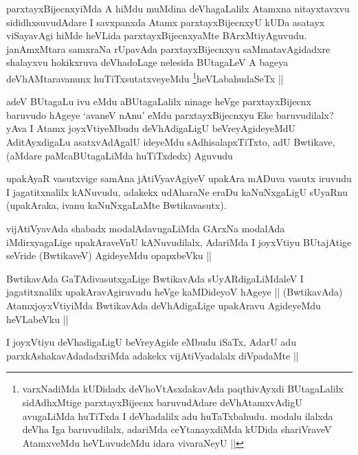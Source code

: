 \begin{artha}
parxtayxBijecnxyiMda A hiMdu muMdina deVhagaLalilx Atamxna nitayxtavxvu sididhxsuvudAdare I savxpanxda Atamx parxtayxBijecnxyU kUDa asatayx viSayavAgi hiMde heVLida parxtayxBijecnxyaMte BArxMtiyAguvudu. janAmxMtara samxraNa rUpavAda parxtayxBijecnxyu saMmatavAgidadxre shalayxvu hokikxruva deVhadoLage nelesida BUtagaLeV A bageya deVhAMtaravanunx huTiTxsutatxveyeMdu \footnote{varxNadiMda kUDidadx deVhoVtAsxdakavAda paqthivAyxdi BUtagaLalilx sidAdhxMtige parxtayxBijecnx baruvudAdare deVhAtamxvAdigU avugaLiMda huTiTxda I deVhadalilx adu huTaTxbahudu. modalu ilalxda deVha Iga baruvudilalx, adariMda ceYtanayxdiMda kUDida shariVraveV AtamxveMdu heVLuvudeMdu idara vivaraNeyU ||}heVLabahudaSeTx ||
\end{artha}

\begin{artha}
adeV BUtagaLu ivu eMdu aBUtagaLalilx ninage heVge parxtayxBijecnx baruvudo hAgeye `avaneV nAnu' eMdu parxtayxBijecnxyu Eke baruvudilalx? yAva I Atamx joyxVtiyeMbudu deVhAdigaLigU beVreyAgideyeMdU AditAyxdigaLu asatxvAdAgalU ideyeMdu sAdhisalapxTiTxto, adU Bwtikave, (aMdare paMcaBUtagaLiMda huTiTxdedx) Aguvudu
\end{artha}

\begin{artha}
upakAyaR vasutxvige samAna jAtiVyavAgiyeV upakAra mADuva vasutx iruvudu I jagatitxnalilx kANuvudu, adakekx udAharaNe eraDu kaNuNxgaLigU sUyaRnu (upakAraka, ivanu kaNuNxgaLaMte Bwtikavasutx).
\end{artha}

\begin{artha}
vijAtiVyavAda shabadx modalAdavugaLiMda GArxNa modalAda iMdirxyagaLige upakAraveVnU kANuvudilalx, AdariMda I joyxVtiyu BUtajAtige seVride (BwtikaveV) AgideyeMdu opapxbeVku ||
\end{artha}

\begin{artha}
BwtikavAda GaTAdivasutxgaLige BwtikavAda sUyARdigaLiMdaleV I jagatitxnalilx upakAravAgiruvudu heVge kaMDideyoV hAgeye || (BwtikavAda) AtamxjoyxVtiyiMda BwtikavAda deVhAdigaLige upakAravu AgideyeMdu heVLabeVku ||
\end{artha}

\begin{artha}
I joyxVtiyu deVhadigaLigU beVreyAgide eMbudu iSaTx, AdarU adu parxkAshakavAdadadxriMda adakekx vijAtiVyadalalx diVpadaMte ||
\end{artha}

